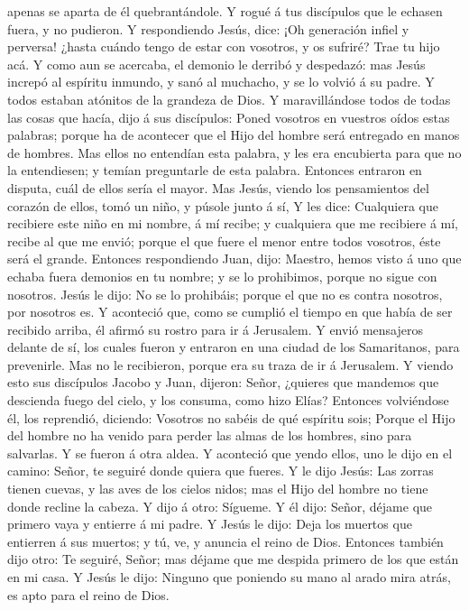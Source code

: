 apenas se aparta de él quebrantándole.  Y rogué á tus
discípulos que le echasen fuera, y no pudieron.  Y
respondiendo Jesús, dice: ¡Oh generación infiel y perversa! ¿hasta
cuándo tengo de estar con vosotros, y os sufriré? Trae tu hijo acá.
 Y como aun se acercaba, el demonio le derribó y
despedazó: mas Jesús increpó al espíritu inmundo, y sanó al muchacho, y
se lo volvió á su padre.  Y todos estaban atónitos de la
grandeza de Dios. Y maravillándose todos de todas las cosas que hacía,
dijo á sus discípulos:  Poned vosotros en vuestros oídos
estas palabras; porque ha de acontecer que el Hijo del hombre será
entregado en manos de hombres.  Mas ellos no entendían
esta palabra, y les era encubierta para que no la entendiesen; y temían
preguntarle de esta palabra.  Entonces entraron en
disputa, cuál de ellos sería el mayor.  Mas Jesús, viendo
los pensamientos del corazón de ellos, tomó un niño, y púsole junto á
sí,  Y les dice: Cualquiera que recibiere este niño en mi
nombre, á mí recibe; y cualquiera que me recibiere á mí, recibe al que
me envió; porque el que fuere el menor entre todos vosotros, éste será
el grande.  Entonces respondiendo Juan, dijo: Maestro,
hemos visto á uno que echaba fuera demonios en tu nombre; y se lo
prohibimos, porque no sigue con nosotros.  Jesús le dijo:
No se lo prohibáis; porque el que no es contra nosotros, por nosotros
es.  Y aconteció que, como se cumplió el tiempo en que
había de ser recibido arriba, él afirmó su rostro para ir á Jerusalem.
 Y envió mensajeros delante de sí, los cuales fueron y
entraron en una ciudad de los Samaritanos, para prevenirle.
 Mas no le recibieron, porque era su traza de ir á
Jerusalem.  Y viendo esto sus discípulos Jacobo y Juan,
dijeron: Señor, ¿quieres que mandemos que descienda fuego del cielo, y
los consuma, como hizo Elías?  Entonces volviéndose él,
los reprendió, diciendo: Vosotros no sabéis de qué espíritu sois;
 Porque el Hijo del hombre no ha venido para perder las
almas de los hombres, sino para salvarlas. Y se fueron á otra aldea.
 Y aconteció que yendo ellos, uno le dijo en el camino:
Señor, te seguiré donde quiera que fueres.  Y le dijo
Jesús: Las zorras tienen cuevas, y las aves de los cielos nidos; mas el
Hijo del hombre no tiene donde recline la cabeza.  Y dijo
á otro: Sígueme. Y él dijo: Señor, déjame que primero vaya y entierre á
mi padre.  Y Jesús le dijo: Deja los muertos que
entierren á sus muertos; y tú, ve, y anuncia el reino de Dios.
 Entonces también dijo otro: Te seguiré, Señor; mas
déjame que me despida primero de los que están en mi casa.
 Y Jesús le dijo: Ninguno que poniendo su mano al arado
mira atrás, es apto para el reino de Dios.

